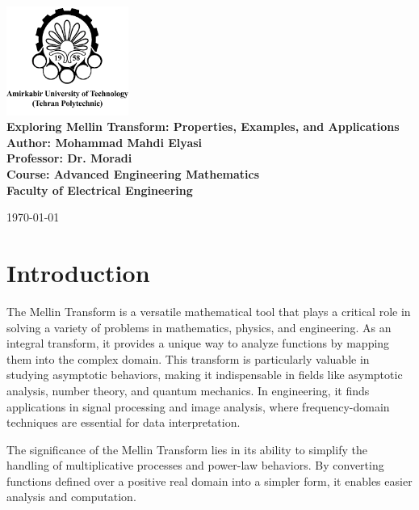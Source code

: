 \documentclass[a4paper, 12pt]{article}
\begin{document}
\begin{center}
    \includegraphics[width=0.3\textwidth]{amirkabir.png} \\[2em]
    \vspace{0.5cm}
    \LARGE \textbf{Exploring Mellin Transform: Properties, Examples, and Applications} \\[1em]
    \large \textbf{Author: Mohammad Mahdi Elyasi} \\[1em]
    \large \textbf{Professor: Dr. Moradi}\\[1em]
    \large \textbf{Course: Advanced Engineering Mathematics} \\[4em]
    \large \textbf{Faculty of Electrical Engineering} \\[4em]
\end{center}

\vfill
\begin{center}
    \large \today
\end{center}

\newpage

\tableofcontents
\newpage

\section{Introduction}
The Mellin Transform is a versatile mathematical tool that plays a critical role in solving a variety of problems in mathematics, physics, and engineering\cite{Mellin}. As an integral transform, it provides a unique way to analyze functions by mapping them into the complex domain. This transform is particularly valuable in studying asymptotic behaviors, making it indispensable in fields like asymptotic analysis, number theory, and quantum mechanics. In engineering, it finds applications in signal processing and image analysis, where frequency-domain techniques are essential for data interpretation.

The significance of the Mellin Transform lies in its ability to simplify the handling of multiplicative processes and power-law behaviors. By converting functions defined over a positive real domain into a simpler form, it enables easier analysis and computation.
\end{document}
